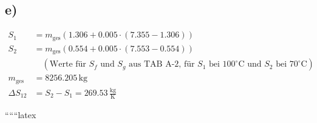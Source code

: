 

\subsection*{e)}
\begin{align*}
S_1 &= m_{\text{ges}} \left( 1.306 + 0.005 \cdot (7.355 - 1.306) \right) \\
S_2 &= m_{\text{ges}} \left( 0.554 + 0.005 \cdot (7.553 - 0.554) \right) \\
&\quad \left( \text{Werte für } S_f \text{ und } S_g \text{ aus TAB A-2, für } S_1 \text{ bei } 100^\circ \text{C} \text{ und } S_2 \text{ bei } 70^\circ \text{C} \right) \\
m_{\text{ges}} &= 8256.205 \, \text{kg} \\
\Delta S_{12} &= S_2 - S_1 = 269.53 \, \frac{\text{kg}}{\text{K}}
\end{align*}

``````latex